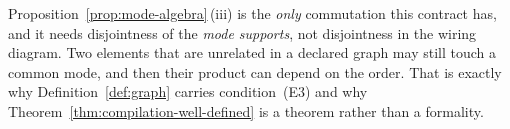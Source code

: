 
\begin{remark}\label{rem:overlap}
Proposition~\ref{prop:mode-algebra}\,(iii) is the \emph{only} commutation this
contract has, and it needs disjointness of the \emph{mode supports}, not
disjointness in the wiring diagram. Two elements that are unrelated in a
declared graph may still touch a common mode, and then their product can
depend on the order. That is exactly why Definition~\ref{def:graph} carries
condition~(E3) and why Theorem~\ref{thm:compilation-well-defined} is a theorem rather than a
formality.
\end{remark}
